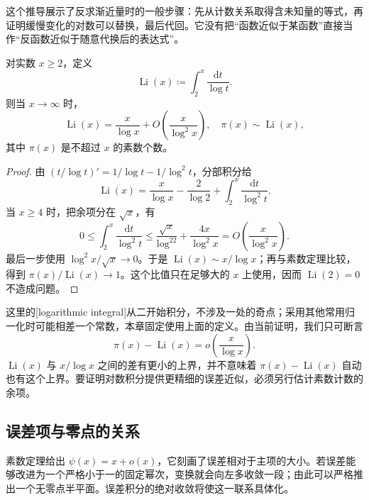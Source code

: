 这个推导展示了反求渐近量时的一般步骤：先从计数关系取得含未知量的等式，再证明缓慢变化的对数可以替换，最后代回。它没有把“函数近似于某函数”直接当作“反函数近似于随意代换后的表达式”。

\begin{proposition}[对数积分与主项尺度]
\label{b3:prop:27-logarithmic-integral}
对实数 \(x\ge2\)，定义
\[
 \operatorname{Li}(x)\coloneqq\int_2^x\frac{\mathrm dt}{\log t}.
\]
则当 \(x\to\infty\) 时，
\[
 \operatorname{Li}(x)=\frac{x}{\log x}
          +O\!\left(\frac{x}{\log^2x}\right),
 \quad
 \pi(x)\sim\operatorname{Li}(x),
\]
其中 \(\pi(x)\) 是不超过 \(x\) 的素数个数。
\end{proposition}
\begin{proof}
由 \((t/\log t)'=1/\log t-1/\log^2t\)，分部积分给
\[
 \operatorname{Li}(x)
 =\frac{x}{\log x}-\frac2{\log2}
             +\int_2^x\frac{\mathrm dt}{\log^2t}.
\]
当 \(x\ge4\) 时，把余项分在 \(\sqrt x\)，有
\[
 0\le\int_2^x\frac{\mathrm dt}{\log^2t}
 \le\frac{\sqrt x}{\log^22}+\frac{4x}{\log^2x}
 =O\!\left(\frac{x}{\log^2x}\right).
\]
最后一步使用 \(\log^2x/\sqrt x\to0\)。于是 \(\operatorname{Li}(x)\sim x/\log x\)；再与素数定理比较，得到 \(\pi(x)/\operatorname{Li}(x)\to1\)。这个比值只在足够大的 \(x\) 上使用，因而 \(\operatorname{Li}(2)=0\) 不造成问题。
\end{proof}

这里的[logarithmic integral]从二开始积分，不涉及一处的奇点；采用其他常用归一化时可能相差一个常数，本章固定使用上面的定义。由当前证明，我们只可断言
\[
 \pi(x)-\operatorname{Li}(x)=o\!\left(\frac{x}{\log x}\right).
\]
\(\operatorname{Li}(x)\) 与 \(x/\log x\) 之间的差有更小的上界，并不意味着 \(\pi(x)-\operatorname{Li}(x)\) 自动也有这个上界。要证明对数积分提供更精细的误差近似，必须另行估计素数计数的余项。

\subsection{误差项与零点的关系}
\label{b3:subsec:270502}

素数定理给出 \(\psi(x)=x+o(x)\)，它刻画了误差相对于主项的大小。若误差能够改进为一个严格小于一的固定幂次，变换就会向左多收敛一段；由此可以严格推出一个无零点半平面。误差积分的绝对收敛将使这一联系具体化。

